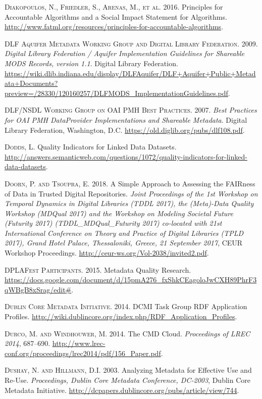 \textsc{Diakopoulos, N., Friedler, S., Arenas, M., et al.} 2016. Principles for Accountable Algorithms and a Social Impact Statement for Algorithms. \url{http://www.fatml.org/resources/principles-for-accountable-algorithms}.

\textsc{DLF Aquifer Metadata Working Group and Digital Library Federation}. 2009. \emph{Digital Library Federation / Aquifer Implementation Guidelines for Shareable MODS Records, version 1.1}. Digital Library Federation. \url{https://wiki.dlib.indiana.edu/display/DLFAquifer/DLF+Aquifer+Public+Metadata+Documents?preview=/28330/120160257/DLFMODS_ImplementationGuidelines.pdf}.

\textsc{DLF/NSDL Working Group on OAI PMH Best Practices}. 2007. \emph{Best Practices for OAI PMH DataProvider Implementations and Shareable Metadata}. Digital Library Federation, Washington, D.C. \url{https://old.diglib.org/pubs/dlf108.pdf}.

\textsc{Dodds, L.} Quality Indicators for Linked Data Datasets. \url{http://answers.semanticweb.com/questions/1072/quality-indicators-for-linked-data-datasets}.

\textsc{Doorn, P. and Tsoupra, E.} 2018. A Simple Approach to Assessing the FAIRness of Data in Trusted Digital Repositories. \emph{Joint Proceedings of the 1st Workshop on Temporal Dynamics in Digital Libraries (TDDL 2017), the (Meta)-Data Quality Workshop (MDQual 2017) and the Workshop on Modeling Societal Future (Futurity 2017) (TDDL\_MDQual\_Futurity 2017) co-located with 21st International Conference on Theory and Practice of Digital Libraries (TPLD 2017), Grand Hotel Palace, Thessaloniki, Greece, 21 September 2017}, CEUR Workshop Proceedings. \url{http://ceur-ws.org/Vol-2038/invited2.pdf}.

\textsc{DPLAFest Participants}. 2015. Metadata Quality Research. \url{https://docs.google.com/document/d/15pmA276_fxShkCEagoloJwCXH89PhrF3qWBgB8xSrag/edit\#}.

\textsc{Dublin Core Metadata Initiative}. 2014. DCMI Task Group RDF Application Profiles. \url{http://wiki.dublincore.org/index.php/RDF_Application_Profiles}.

\textsc{Durco, M. and Windhouwer, M.} 2014. The CMD Cloud. \emph{Proceedings of LREC 2014}, 687–690. \url{http://www.lrec-conf.org/proceedings/lrec2014/pdf/156_Paper.pdf}.

\textsc{Dushay, N. and Hillmann, D.I.} 2003. Analyzing Metadata for Effective Use and Re-Use. \emph{Proceedings, Dublin Core Metadata Conference, DC-2003}, Dublin Core Metadata Initiative. \url{http://dcpapers.dublincore.org/pubs/article/view/744}.

